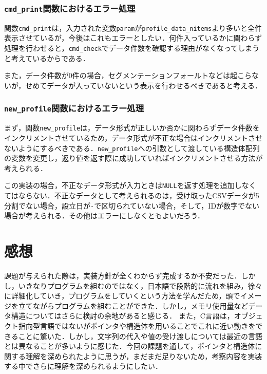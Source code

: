 \documentclass[a4j,11pt]{jarticle}
\begin{document}
\subsubsection{\texttt{cmd\_print}関数におけるエラー処理}
関数\verb|cmd_print|は，入力された変数\verb|param|が\verb|profile_data_nitems|より多いと全件表示させているが，今後はこれもエラーとしたい．何件入っているかに関わらず処理を行わせると，\verb|cmd_check|でデータ件数を確認する理由がなくなってしまうと考えているからである．

また，データ件数が$0$件の場合，セグメンテーションフォールトなどは起こらないが，せめてデータが入っていないという表示を行わせるべきであると考える．
\subsubsection{\texttt{new\_profile}関数におけるエラー処理}

まず，関数\verb|new_profile|は，データ形式が正しいか否かに関わらずデータ件数をインクリメントさせているため，データ形式が不正な場合はインクリメントさせないようにするべきである．\verb|new_profile|への引数として渡している構造体配列の変数を変更し，返り値を返す際に成功していればインクリメントさせる方法が考えられる．

この実装の場合，不正なデータ形式が入力ときは\verb|NULL|を返す処理を追加しなくてはならない．不正なデータとして考えられるのは，受け取ったCSVデータが5分割でない場合，設立日が\verb|-|で区切られていない場合，そして，IDが数字でない場合が考えられる．その他はエラーにしなくともよいだろう．

\section{感想}
課題が与えられた際は，実装方針が全くわからず完成するか不安だった．しかし，いきなりプログラムを組むのではなく，日本語で段階的に流れを組み，徐々に詳細化していき，プログラムをしていくという方法を学んだため，頭でイメージを立てながらプログラムを組むことができた．しかし，メモリ使用量などデータ構造についてはさらに検討の余地があると感じる．
また，C言語は，オブジェクト指向型言語ではないがポインタや構造体を用いることでこれに近い動きをできることに驚いた．しかし，文字列の代入や値の受け渡しについては最近の言語とは異なることが多いように感じた．今回の課題を通して，ポインタと構造体に関する理解を深められたように思うが，まだまだ足りないため，考察内容を実装する中でさらに理解を深められるようにしたい．
\end{document}
